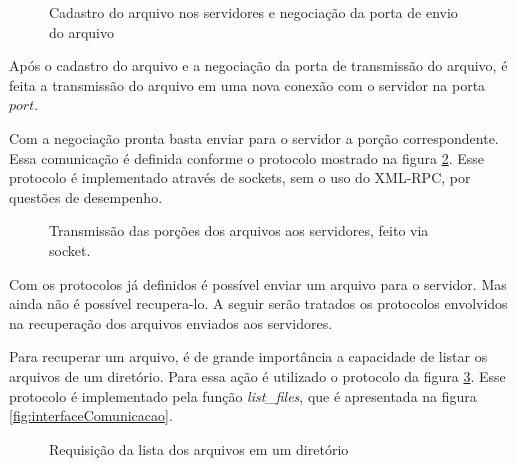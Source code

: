         \begin{figure}[!ht]
        
        \caption{Cadastro do arquivo nos servidores e negociação da porta de envio do arquivo}
        \label{fig:protSendFile}
        \end{figure}
        
        Após o cadastro do arquivo e a negociação da porta de transmissão do arquivo, é feita a transmissão do arquivo em uma nova conexão com o servidor na porta $port$.
        
        Com a negociação pronta basta enviar para o servidor a porção correspondente. Essa comunicação é definida conforme o protocolo mostrado na figura \ref{fig:protSendFileData}. Esse protocolo é implementado através de sockets, sem o uso do XML-RPC, por questões de desempenho.
        
        \begin{figure}[!ht]
        \caption{Transmissão das porções dos arquivos aos servidores, feito via socket.}
        \label{fig:protSendFileData}
        \end{figure}
        
        
        Com os protocolos já definidos é possível enviar um arquivo para o servidor. Mas ainda não é possível recupera-lo. A seguir serão tratados os protocolos envolvidos na recuperação dos arquivos enviados aos servidores.
        
        Para recuperar um arquivo, é de grande importância a capacidade de listar os arquivos de um diretório. Para essa ação é utilizado o protocolo da figura \ref{fig:protListFiles}. Esse protocolo é implementado pela função \textit{list\_files}, que é apresentada na figura \ref{fig:interfaceComunicacao}.
        
        \begin{figure}[!ht]
        \caption{Requisição da lista dos arquivos em um diretório}
        \label{fig:protListFiles}
        \end{figure}
        
